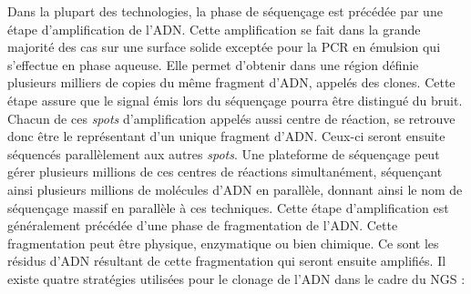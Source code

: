 \documentclass[12pt,twoside]{reedthesis}
\theoremstyle{definition}
\theoremstyle{definition}
\theoremstyle{remark}
\begin{document}
  Dans la plupart des technologies, la phase de séquençage est précédée
  par une étape d'amplification de l'ADN. Cette amplification se fait dans
  la grande majorité des cas sur une surface solide exceptée pour la PCR
  en émulsion qui s'effectue en phase aqueuse. Elle permet d'obtenir dans
  une région définie plusieurs milliers de copies du même fragment d'ADN,
  appelés des clones. Cette étape assure que le signal émis lors du
  séquençage pourra être distingué du bruit. Chacun de ces \emph{spots}
  d'amplification appelés aussi centre de réaction, se retrouve donc être
  le représentant d'un unique fragment d'ADN. Ceux-ci seront ensuite
  séquencés parallèlement aux autres \emph{spots}. Une plateforme de
  séquençage peut gérer plusieurs millions de ces centres de réactions
  simultanément, séquençant ainsi plusieurs millions de molécules d'ADN en
  parallèle, donnant ainsi le nom de séquençage massif en parallèle à ces
  techniques. Cette étape d'amplification est généralement précédée d'une
  phase de fragmentation de l'ADN. Cette fragmentation peut être physique,
  enzymatique ou bien chimique. Ce sont les résidus d'ADN résultant de
  cette fragmentation qui seront ensuite amplifiés. Il existe quatre
  stratégies utilisées pour le clonage de l'ADN dans le cadre du NGS :
  
\end{document}
